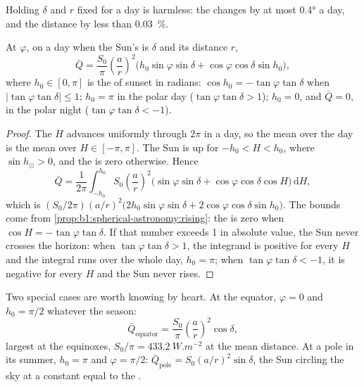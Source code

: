 Holding $\delta$ and $r$ fixed for a day is harmless: the  changes by
at most \ang{0.4} a day, and the distance by less than \qty{0.03}{\percent}.

\begin{theorem}\label{thm:b1:radiation-heat-transport:daily}
At  $\varphi$, on a day when the Sun's  is $\delta$ and its
distance $r$,
\[
  \bar Q = \frac{S_0}{\pi}\left(\frac{a}{r}\right)^{2}
  \bigl(h_0\sin\varphi\sin\delta + \cos\varphi\cos\delta\sin h_0\bigr),
\]
where $h_0 \in [0, \pi]$ is the  of sunset in radians: $\cos h_0 =
-\tan\varphi\tan\delta$ when $|\tan\varphi\tan\delta| \le 1$; $h_0 = \pi$ in the
polar day ($\tan\varphi\tan\delta > 1$); $h_0 = 0$, and $\bar Q = 0$, in the polar
night ($\tan\varphi\tan\delta < -1$).
\end{theorem}

\begin{proof}
The  $H$ advances uniformly through $2\pi$ in a day, so the mean over
the day is the mean over $H \in [-\pi, \pi]$. The Sun is up for $-h_0 < H < h_0$,
where $\sin h_\odot > 0$, and the  is zero otherwise. Hence
\[
  \bar Q = \frac{1}{2\pi}\int_{-h_0}^{h_0} S_0\left(\frac{a}{r}\right)^{2}
  \bigl(\sin\varphi\sin\delta + \cos\varphi\cos\delta\cos H\bigr)\,\mathrm dH ,
\]
which is $(S_0/2\pi)(a/r)^2\bigl(2h_0\sin\varphi\sin\delta +
2\cos\varphi\cos\delta\sin h_0\bigr)$.
The bounds come from \cref{prop:b1:spherical-astronomy:rising}: the  is
zero when $\cos H = -\tan\varphi\tan\delta$. If that number exceeds 1 in absolute
value, the Sun never crosses the horizon: when $\tan\varphi\tan\delta > 1$, the
integrand is positive for every $H$ and the integral runs over the whole day,
$h_0 = \pi$; when $\tan\varphi\tan\delta < -1$, it is negative for every $H$ and
the Sun never rises.
\end{proof}

Two special cases are worth knowing by heart. At the equator, $\varphi = 0$ and
$h_0 = \pi/2$ whatever the season:
\[
  \bar Q_\text{equator} = \frac{S_0}{\pi}\left(\frac{a}{r}\right)^{2}\cos\delta ,
\]
largest at the equinoxes, $S_0/\pi = \qty{433.2}{W.m^{-2}}$ at the mean distance.
At a pole in its summer, $h_0 = \pi$ and $\varphi = \pi/2$: $\bar Q_\text{pole} =
S_0(a/r)^2\sin\delta$, the Sun circling the sky at a constant  equal to
the .

